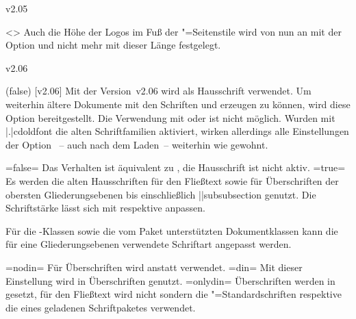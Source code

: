 \begin{Entity}{}
\begin{NoIndexDefault}
\begin{Cessations}{v2.05}
\begin{Cessation}
  {}
  <>
\printdeclarationlist
%
Auch die Höhe der Logos im Fuß der "=Seitenstile wird 
von nun an mit der Option  und nicht mehr mit dieser 
Länge festgelegt.
\end{Cessation}
\end{Cessations}



\begin{Cessations}{v2.06}
\begin{Declaration}
  {}
  (false)
  [v2.06]
\printdeclarationlist
%
Mit der Version~v2.06 wird \OpenSans als Hausschrift verwendet. Um weiterhin 
ältere Dokumente mit den Schriften \Univers und \DIN erzeugen zu können, wird 
diese Option bereitgestellt.
Die Verwendung mit  oder  ist nicht möglich. 
Wurden mit \Option|.|{cdoldfont} die alten Schriftfamilien aktiviert, wirken 
allerdings alle Einstellungen der Option ~-- auch nach dem 
Laden~-- weiterhin wie gewohnt.
\begin{DeclareValues}
\itemval=false=
  Das Verhalten ist äquivalent zu , die Hausschrift ist 
  nicht aktiv.
\itemval*=true=
  Es werden die alten Hausschriften \Univers für den Fließtext sowie \DIN für 
  Überschriften der obersten Gliederungsebenen bis einschließlich 
  \Macro||{subsubsection} genutzt. Die Schriftstärke lässt sich mit 
   respektive  anpassen.
\end{DeclareValues}

Für die \TUDScript-Klassen sowie die vom Paket  
unterstützten Dokumentklassen kann die für eine Gliederungsebenen verwendete 
Schriftart angepasst werden.
\begin{DeclareValues}
\itemval=nodin=
  Für Überschriften wird \Univers anstatt \DIN verwendet.
\itemval=din=
  Mit dieser Einstellung wird \DIN in Überschriften genutzt. 
\itemval=onlydin=
  Überschriften werden in \DIN gesetzt, für den Fließtext wird nicht \Univers 
  sondern die "=Standardschriften respektive die eines geladenen 
  Schriftpaketes verwendet.
\end{DeclareValues}
\end{Declaration}


\end{Cessations}
\end{NoIndexDefault}
\end{Entity}
